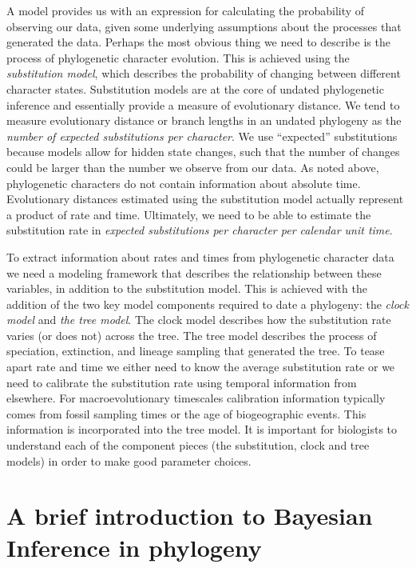 \documentclass[11pt]{article}
\begin{document}
A model provides us with an expression for calculating the probability of observing our data, given some underlying assumptions about the processes that generated the data. 
Perhaps the most obvious thing we need to describe is the process of phylogenetic character evolution.
This is achieved using the \textit{substitution model}, which describes the probability of changing between different character states.
Substitution models are at the core of undated phylogenetic inference and essentially provide a measure of evolutionary distance.
We tend to measure evolutionary distance or branch lengths in an undated phylogeny as the \textit{number of expected substitutions per character}. We use ``expected'' substitutions because models allow for hidden state changes, such that the number of changes could be larger than the number we observe from our data.
As noted above, phylogenetic characters do not contain information about absolute time. Evolutionary distances estimated using the substitution model actually represent a product of rate and time.
Ultimately, we need to be able to estimate the substitution rate in \textit{expected substitutions per character per calendar unit time}.

To extract information about rates and times from phylogenetic character data we need a modeling framework that describes the  relationship between these variables, in addition to the substitution model.
This is achieved with the addition of the two key model components required to date a phylogeny: the \textit{clock model} and \textit{the tree model}.
The clock model describes how the substitution rate varies (or does not) across the tree.
The tree model describes the process of speciation, extinction, and lineage sampling that generated the tree.
To tease apart rate and time we either need to know the average substitution rate or we need to calibrate the substitution rate using temporal information from elsewhere.
For macroevolutionary timescales calibration information typically comes from fossil sampling times or the age of biogeographic events. This information is incorporated into the tree model.
It is important for biologists to understand each of the component pieces (the substitution, clock and tree models) in order to make good parameter choices.

\section{A brief introduction to Bayesian Inference in phylogeny}
\end{document}
